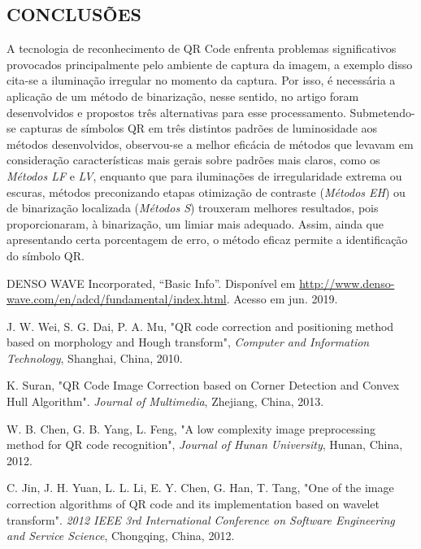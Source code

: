 \documentclass{ceel}
\begin{document}
\begin{multicols}{2}
\section{CONCLUSÕES}
A tecnologia de reconhecimento de QR Code enfrenta problemas significativos provocados principalmente pelo ambiente de captura da imagem, a exemplo disso cita-se a iluminação irregular no momento da captura. Por isso, é necessária a aplicação de um método de binarização, nesse sentido, no artigo foram desenvolvidos e propostos três alternativas para esse processamento. Submetendo-se capturas de símbolos QR em três distintos padrões de luminosidade aos métodos desenvolvidos, observou-se a melhor eficácia de métodos que levavam em consideração características mais gerais sobre padrões mais claros, como os \emph{Métodos LF} e \textit{LV}, enquanto que para iluminações de irregularidade extrema ou escuras, métodos preconizando etapas otimização de contraste (\emph{Métodos EH}) ou de binarização localizada (\emph{Métodos S}) trouxeram melhores resultados, pois proporcionaram, à binarização, um limiar mais adequado. Assim, ainda que apresentando certa porcentagem de erro, o método eficaz permite a identificação do símbolo QR.

\begin{thebibliography}{9} %

    DENSO WAVE Incorporated,
    “Basic Info”. 
    Disponível em \url{http://www.denso-wave.com/en/adcd/fundamental/index.html}. Acesso em jun. 2019.

J. W. Wei, S. G. Dai, P. A. Mu, 
"QR code correction and positioning method based on morphology and Hough transform", 
\emph{Computer and Information
Technology}, Shanghai, China, 2010.

K. Suran, 
"QR Code Image Correction based on Corner Detection and Convex Hull Algorithm". 
\emph{Journal of Multimedia}, Zhejiang, China, 2013.

 W. B. Chen, G. B. Yang, L. Feng, 
"A low complexity image preprocessing method for QR code recognition", 
\emph{Journal of Hunan University}, Hunan, China, 2012.

C. Jin, J. H. Yuan, L. L. Li, E. Y. Chen, G. Han, T. Tang, 
"One of the image correction algorithms of QR code and its implementation
based on wavelet transform".
\emph{2012 IEEE 3rd International Conference on
Software Engineering and Service Science}, Chongqing, China, 2012.


\end{thebibliography}
\end{multicols}
\end{document}
